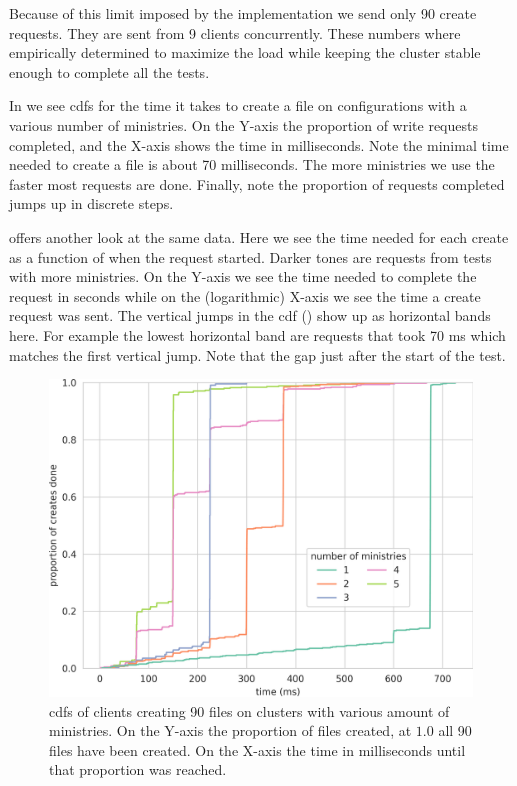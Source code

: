 Because of this limit imposed by the implementation we send only 90 create requests. They are sent from 9 clients concurrently. These numbers where empirically determined to maximize the load while keeping the cluster stable enough to complete all the tests.

In  we see \acp{cdf} for the time it takes to create a file on configurations with a various number of ministries. On the Y-axis the proportion of write requests completed, and the X-axis shows the time in milliseconds. Note the minimal time needed to create a file is about 70 milliseconds. The more ministries we use the faster most requests are done. Finally, note the proportion of requests completed jumps up in discrete steps.

 offers another look at the same data. Here we see the time needed for each create as a function of when the request started. Darker tones are requests from tests with more ministries. On the Y-axis we see the time needed to complete the request in seconds while on the (logarithmic) X-axis we see the time a create request was sent. The vertical jumps in the \ac{cdf} () show up as horizontal bands here. For example the lowest horizontal band are requests that took 70 ms which matches the first vertical jump. Note that the gap just after the start of the test.

\begin{figure}[htbp]
	\centering
	\includegraphics[height=\textheight]{../results/plots/touch.png}
	\caption{\acp{cdf} of clients creating 90 files on clusters with various amount of ministries. On the Y-axis the proportion of files created, at $1.0$ all 90 files have been created. On the X-axis the time in milliseconds until that proportion was reached.}
	\label{fig:touch}
\end{figure}

